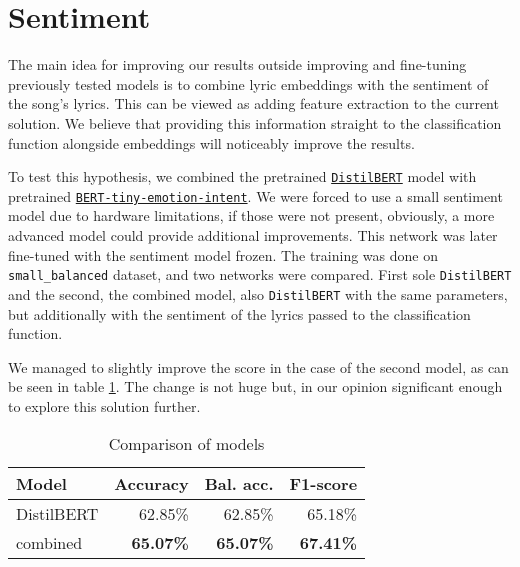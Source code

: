 \section{Sentiment}

The main idea for improving our results outside improving and fine-tuning previously tested models is to combine lyric embeddings with the sentiment of the song's lyrics. This can be viewed as adding feature extraction to the current solution. We believe that providing this information straight to the classification function alongside embeddings will noticeably improve the results. 

To test this hypothesis, we combined the pretrained \href{https://huggingface.co/distilbert-base-uncased-finetuned-sst-2-english}{\texttt{DistilBERT}} model with  pretrained \href{https://huggingface.co/gokuls/BERT-tiny-emotion-intent}{\texttt{BERT-tiny-emotion-intent}}. We were forced to use a small sentiment model due to hardware limitations, if those were not present, obviously, a more advanced model could provide additional improvements. This network was later fine-tuned with the sentiment model frozen. The training was done on \texttt{small\_balanced} dataset, and two networks were compared. First sole \texttt{DistilBERT} and the second, the combined model, also \texttt{DistilBERT} with the same parameters, but additionally with the sentiment of the lyrics passed to the classification function. 

We managed to slightly improve the score in the case of the second model, as can be seen in table \ref{tab:sentiment_scores}. The change is not huge but, in our opinion significant enough to explore this solution further. 

\begin{table}[!h]
    \centering
    \begin{tabular}{l|r|r|r}
        \textbf{Model} & \textbf{Accuracy} & \textbf{Bal. acc.}  & \textbf{F1-score} \\ \hline
        DistilBERT         & 62.85\%           & 62.85\%           & 65.18\%          \\
        combined  & \textbf{65.07\%}           & \textbf{65.07\%}           & \textbf{67.41\% }          
    \end{tabular}
    \caption{Comparison of models}
    \label{tab:sentiment_scores}
\end{table}
